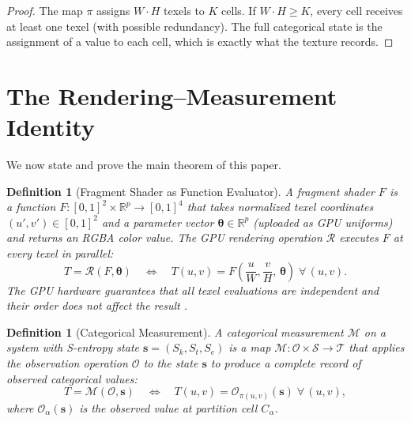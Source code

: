\documentclass[11pt,twocolumn,a4paper]{article}
\newtheorem{definition}[theorem]{Definition}
\newcommand{\Sk}{S_k}
\newcommand{\St}{S_t}
\newcommand{\Se}{S_e}
\newcommand{\R}{\mathbb{R}}
\newcommand{\Tex}{\mathcal{T}}
\newcommand{\Obs}{\mathcal{O}}
\newcommand{\Rend}{\mathcal{R}}
\newcommand{\Meas}{\mathcal{M}}
\begin{document}
\begin{proof}
The map $\pi$ assigns $W \cdot H$ texels to $K$ cells. If
$W \cdot H \geq K$, every cell receives at least one texel (with
possible redundancy). The full categorical state is the assignment
of a value to each cell, which is exactly what the texture records.
\end{proof}


\section{The Rendering--Measurement Identity}
\label{sec:rmi}

We now state and prove the main theorem of this paper.

\begin{definition}[Fragment Shader as Function Evaluator]
\label{def:fragment-shader}
A \emph{fragment shader} $F$ is a function
$F : [0,1]^2 \times \R^p \to [0,1]^4$
that takes normalized texel coordinates $(u',v') \in [0,1]^2$ and a
parameter vector $\bm{\theta} \in \R^p$ (uploaded as GPU uniforms)
and returns an RGBA color value. The GPU \emph{rendering operation}
$\Rend$ executes $F$ at every texel in parallel:
\begin{equation}
T = \Rend(F, \bm{\theta})
  \quad\Leftrightarrow\quad
  T(u,v) = F\!\left(\frac{u}{W}, \frac{v}{H},\, \bm{\theta}\right)
  \;\forall\,(u,v).
\label{eq:rendering}
\end{equation}
The GPU hardware guarantees that all texel evaluations are independent
and their order does not affect the result \citep{khronosglsl}.
\end{definition}

\begin{definition}[Categorical Measurement]
\label{def:categorical-measurement}
A \emph{categorical measurement} $\Meas$ on a system with S-entropy
state $\bm{s} = (\Sk, \St, \Se)$ is a map
$\Meas : \Obs \times \mathcal{S} \to \Tex$
that applies the observation operation $\Obs$ to the state $\bm{s}$
to produce a complete record of observed categorical values:
\begin{equation}
T = \Meas(\Obs, \bm{s})
  \quad\Leftrightarrow\quad
  T(u,v) = \Obs_{\pi(u,v)}(\bm{s})
  \;\forall\,(u,v),
\label{eq:measurement}
\end{equation}
where $\Obs_\alpha(\bm{s})$ is the observed value at partition cell
$C_\alpha$.
\end{definition}
\end{document}
